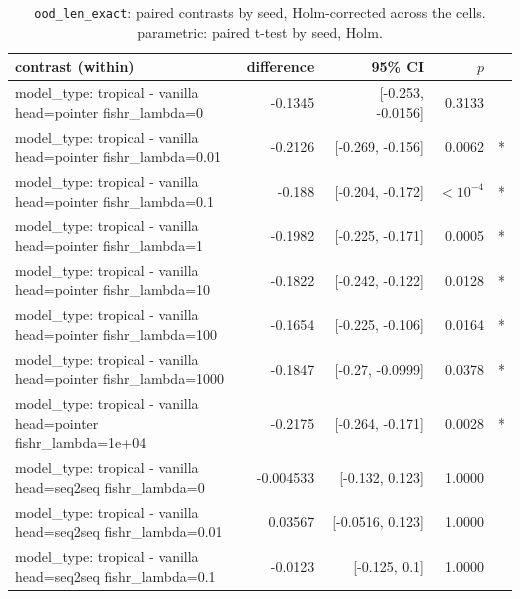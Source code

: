 \documentclass[10pt]{article}
\makeatletter
\newcommand{\stackcell}[1]{\begin{tabular}[t]{@{}l@{}}#1\end{tabular}}
\makeatother
\begin{document}
{\small
\begin{longtable}{lrrrl}
\caption{\texttt{ood\_len\_exact}: paired contrasts by seed, Holm-corrected across the cells. parametric: paired t-test by seed, Holm.}\label{tab:paired-ood_len_exact}\\
\toprule
contrast (within) & difference & 95\% CI & $p$ & \\
\midrule
\endhead
\stackcell{model\_type: tropical - vanilla\\\footnotesize head=pointer fishr\_lambda=0 } & -0.1345 & [-0.253, -0.0156] & 0.3133 & \\
\stackcell{model\_type: tropical - vanilla\\\footnotesize head=pointer fishr\_lambda=0.01 } & -0.2126 & [-0.269, -0.156] & 0.0062 & *\\
\stackcell{model\_type: tropical - vanilla\\\footnotesize head=pointer fishr\_lambda=0.1 } & -0.188 & [-0.204, -0.172] & $<10^{-4}$ & *\\
\stackcell{model\_type: tropical - vanilla\\\footnotesize head=pointer fishr\_lambda=1 } & -0.1982 & [-0.225, -0.171] & 0.0005 & *\\
\stackcell{model\_type: tropical - vanilla\\\footnotesize head=pointer fishr\_lambda=10 } & -0.1822 & [-0.242, -0.122] & 0.0128 & *\\
\stackcell{model\_type: tropical - vanilla\\\footnotesize head=pointer fishr\_lambda=100 } & -0.1654 & [-0.225, -0.106] & 0.0164 & *\\
\stackcell{model\_type: tropical - vanilla\\\footnotesize head=pointer fishr\_lambda=1000 } & -0.1847 & [-0.27, -0.0999] & 0.0378 & *\\
\stackcell{model\_type: tropical - vanilla\\\footnotesize head=pointer fishr\_lambda=1e+04 } & -0.2175 & [-0.264, -0.171] & 0.0028 & *\\
\stackcell{model\_type: tropical - vanilla\\\footnotesize head=seq2seq fishr\_lambda=0 } & -0.004533 & [-0.132, 0.123] & 1.0000 & \\
\stackcell{model\_type: tropical - vanilla\\\footnotesize head=seq2seq fishr\_lambda=0.01 } & 0.03567 & [-0.0516, 0.123] & 1.0000 & \\
\stackcell{model\_type: tropical - vanilla\\\footnotesize head=seq2seq fishr\_lambda=0.1 } & -0.0123 & [-0.125, 0.1] & 1.0000 & \\

\end{longtable}}
\end{document}
